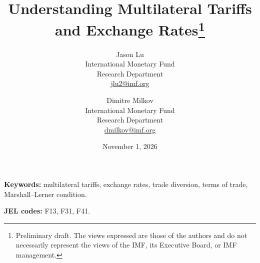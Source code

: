 \documentclass[11pt]{article}
\title{\textbf{Understanding Multilateral Tariffs and Exchange Rates}\thanks{Preliminary draft. The views expressed are those of the authors and do not necessarily represent the views of the IMF, its Executive Board, or IMF management.}}
\author{Jason Lu\\[2pt]
  {\small International Monetary Fund}\\
  {\small Research Department}\\
  {\small\href{mailto:jlu2@imf.org}{jlu2@imf.org}}
  \and
  Dimitre Milkov\\[2pt]
  {\small International Monetary Fund}\\
  {\small Research Department}\\
  {\small\href{mailto:dmilkov@imf.org}{dmilkov@imf.org}}}
\date{November 1, 2026}
\numberwithin{equation}{section}
\theoremstyle{plain}
\theoremstyle{definition}
\theoremstyle{remark}
\begin{document}
\begingroup
\singlespacing
\maketitle
\thispagestyle{empty}
\begin{abstract}
\small\noindent
\end{abstract}

\vspace{4pt}
\noindent\textbf{Keywords:} multilateral tariffs, exchange rates, trade diversion, terms of trade, Marshall--Lerner condition.

\noindent\textbf{JEL codes:} F13, F31, F41.
\clearpage
\endgroup
\setcounter{page}{1}
\onehalfspacing









\clearpage
\singlespacing


\onehalfspacing

\appendix
{}



\end{document}
